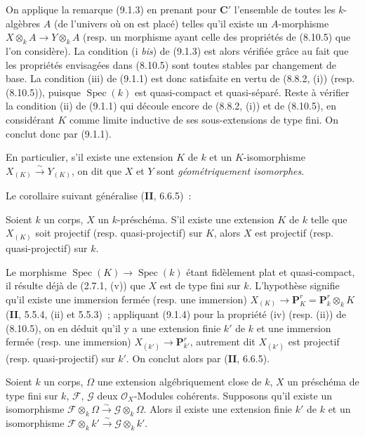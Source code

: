 On applique la remarque (9.1.3) en prenant pour $\boldsymbol{C}'$ l'ensemble de
toutes les $k$-algèbres $A$ (de l'univers où on est placé) telles qu'il existe
un $A$-morphisme $X\otimes_k A\to Y\otimes_k A$ (resp. un morphisme ayant
celle des propriétés de (8.10.5) que l'on considère). La condition (i \emph{bis}) de
(9.1.3) est alors vérifiée grâce au fait que les
propriétés envisagées dans (8.10.5) sont toutes stables par changement de base.
La condition (iii) de (9.1.1) est donc satisfaite en vertu de (8.8.2, (i))
(resp. (8.10.5)), puisque $\operatorname{Spec}(k)$ est quasi-compact et
quasi-séparé. Reste à vérifier la condition (ii) de (9.1.1) qui découle encore
de (8.8.2, (i)) et de (8.10.5), en considérant $K$ comme limite inductive de
ses sous-extensions de type fini. On conclut donc par (9.1.1).

En particulier, s'il existe une extension $K$ de $k$ et un $K$-isomorphisme
$X_{(K)}\xrightarrow{\sim}Y_{(K)}$, on dit que $X$ et $Y$ sont
\emph{géométriquement isomorphes}.

Le corollaire suivant généralise (\textbf{II}, 6.6.5)~:

\begin{corollary}[9.1.5]
\label{IV.9.1.5-fr}
Soient $k$ un corps, $X$ un $k$-préschéma. S'il existe une extension $K$ de
$k$ telle que $X_{(K)}$ soit projectif (\textup{resp.} quasi-projectif) sur $K$, alors
$X$ est projectif (\textup{resp.} quasi-projectif) sur $k$.
\end{corollary}

Le morphisme $\operatorname{Spec}(K)\to\operatorname{Spec}(k)$ étant
fidèlement plat et quasi-compact, il résulte déjà de (2.7.1, (v)) que $X$ est
de type fini sur $k$. L'hypothèse signifie qu'il existe une immersion fermée
(resp. une immersion) $X_{(K)}\to\mathbf P_K^r=\mathbf P_k^r\otimes_k K$
(\textbf{II}, 5.5.4, (ii) et 5.5.3)~; appliquant (9.1.4) pour la propriété (iv)
(resp. (ii)) de (8.10.5), on en déduit qu'il y a une extension finie $k'$ de
$k$ et une immersion fermée (resp. une immersion)
$X_{(k')}\to\mathbf P_{k'}^r$, autrement dit $X_{(k')}$ est projectif
(resp. quasi-projectif) sur $k'$. On conclut alors par (\textbf{II}, 6.6.5).

\begin{proposition}[9.1.6]
\label{IV.9.1.6-fr}
Soient $k$ un corps, $\Omega$ une extension algébriquement close de $k$,
$X$ un préschéma de type fini sur $k$, $\mathcal F$, $\mathcal G$ deux
$\mathcal O_X$-Modules cohérents. Supposons qu'il existe un isomorphisme
$\mathcal F\otimes_k\Omega\xrightarrow{\sim}\mathcal G\otimes_k\Omega$.
Alors il existe une extension finie $k'$ de $k$ et un isomorphisme
$\mathcal F\otimes_k k'\xrightarrow{\sim}\mathcal G\otimes_k k'$.
\end{proposition}

